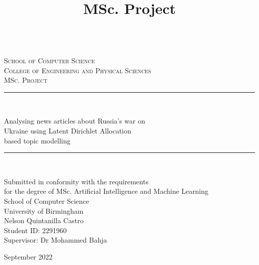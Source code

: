 \documentclass[twoside,11pt,a4paper]{article}
\title{MSc. Project\\\bhamthesistitle}
\author{\textsf{\bhamstudentname}}
\date{}
\newcommand{\bhamstudentname}{Nelson Quintanilla Castro}
\newcommand{\bhamfronttitle}{Analysing news articles about Russia’s war on\\Ukraine using Latent Dirichlet Allocation\\ based topic modelling}
\newcommand{\bhamschool}{School of Computer Science}
\newcommand{\bhamcollege}{Engineering and Physical Sciences}
\newcommand{\bhamdegree}{MSc. Artificial Intelligence and Machine Learning}
\newcommand{\bhamid}{2291960}
\newcommand{\bhamsupervisor}{Dr Mohammed Bahja}
\newcommand{\bhamyear}{2022}
\newcommand{\HRule}{\rule{\linewidth}{0.5mm}}
\begin{document}
\begin{titlepage}
\begin{center}
\begin{minipage}{6in}
  \centering
  \hspace*{.2in}
  \end{minipage}
  \\ [1.0cm]
\textsc{{\LARGE \bhamschool\\}College of \bhamcollege}\\[3.5cm]

\textsc{\Large MSc. Project}\\[0.5cm]

\HRule \\[0.4cm]
\begin{center}\Huge
\bhamfronttitle
\end{center}
\HRule \\[1.5cm]

\begin{center}
Submitted in conformity with the requirements\\ for the degree of \bhamdegree\\
\bhamschool\\ University of Birmingham\\
\vspace{2cm}
\bhamstudentname\\
Student ID: \bhamid\\
Supervisor: \bhamsupervisor      
\end{center}
\vfill

{\large September \bhamyear}

\end{center}
\end{titlepage}
\cleardoublepage
\end{document}

